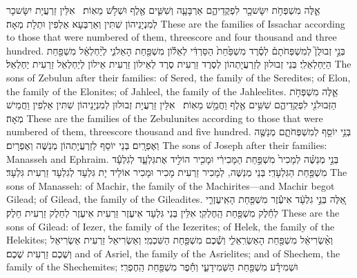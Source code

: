 {אֵ֛לֶּה מִשְׁפְּחֹ֥ת יִשָּׂשכָ֖ר לִפְקֻדֵיהֶ֑ם אַרְבָּעָ֧ה וְשִׁשִּׁ֛ים אֶ֖לֶף וּשְׁלֹ֥שׁ מֵאֽוֹת׃ \setuma }
{אִלֵּין זַרְעֲיָת יִשָּׂשכָר לְמִנְיָנֵיהוֹן שִׁתִּין וְאַרְבְּעָא אַלְפִין וּתְלָת מְאָה׃}
{These are the families of Issachar according to those that were numbered of them, threescore and four thousand and three hundred.}{}
{בְּנֵ֣י זְבוּלֻן֮ לְמִשְׁפְּחֹתָם֒ לְסֶ֗רֶד מִשְׁפַּ֙חַת֙ הַסַּרְדִּ֔י לְאֵל֕וֹן מִשְׁפַּ֖חַת הָאֵלֹנִ֑י לְיַ֨חְלְאֵ֔ל מִשְׁפַּ֖חַת הַיַּחְלְאֵלִֽי׃}
{בְּנֵי זְבוּלוּן לְזַרְעֲיָתְהוֹן לְסֶרֶד זַרְעִית סֶרֶד לְאֵילוֹן זַרְעִית אֵילוֹן לְיַחְלְאֵל זַרְעִית יַחְלְאֵל׃}
{The sons of Zebulun after their families: of Sered, the family of the Seredites; of Elon, the family of the Elonites; of Jahleel, the family of the Jahleelites.}{}
{אֵ֛לֶּה מִשְׁפְּחֹ֥ת הַזְּבוּלֹנִ֖י לִפְקֻדֵיהֶ֑ם שִׁשִּׁ֥ים אֶ֖לֶף וַחֲמֵ֥שׁ מֵאֽוֹת׃ \setuma }
{אִלֵּין זַרְעֲיָת זְבוּלוּן לְמִנְיָנֵיהוֹן שִׁתִּין אַלְפִין וַחֲמֵישׁ מְאָה׃}
{These are the families of the Zebulunites according to those that were numbered of them, threescore thousand and five hundred.}{}
{בְּנֵ֥י יוֹסֵ֖ף לְמִשְׁפְּחֹתָ֑ם מְנַשֶּׁ֖ה וְאֶפְרָֽיִם׃}
{בְּנֵי יוֹסֵף לְזַרְעֲיָתְהוֹן מְנַשֶּׁה וְאֶפְרָיִם׃}
{The sons of Joseph after their families: Manasseh and Ephraim.}{}
{בְּנֵ֣י מְנַשֶּׁ֗ה לְמָכִיר֙ מִשְׁפַּ֣חַת הַמָּכִירִ֔י וּמָכִ֖יר הוֹלִ֣יד אֶת\maqqaf גִּלְעָ֑ד לְגִלְעָ֕ד מִשְׁפַּ֖חַת הַגִּלְעָדִֽי׃}
{ בְּנֵי מְנַשֶּׁה, לְמָכִיר זַרְעִית מָכִיר וּמָכִיר אוֹלֵיד יָת גִּלְעָד לְגִלְעָד זַרְעִית גִּלְעָד׃}
{The sons of Manasseh: of Machir, the family of the Machirites—and Machir begot Gilead; of Gilead, the family of the Gileadites.}{}
{אֵ֚לֶּה בְּנֵ֣י גִלְעָ֔ד אִיעֶ֕זֶר מִשְׁפַּ֖חַת הָאִֽיעֶזְרִ֑י לְחֵ֕לֶק מִשְׁפַּ֖חַת הַֽחֶלְקִֽי׃}
{אִלֵּין בְּנֵי גִּלְעָד אִיעֶזֶר זַרְעִית אִיעֶזֶר לְחֵלֶק זַרְעִית חֵלֶק׃}
{These are the sons of Gilead: of Iezer, the family of the Iezerites; of Helek, the family of the Helekites;}{}
{וְאַ֨שְׂרִיאֵ֔ל מִשְׁפַּ֖חַת הָאַשְׂרִֽאֵלִ֑י וְשֶׁ֕כֶם מִשְׁפַּ֖חַת הַשִּׁכְמִֽי׃}
{וְאַשְׂרִיאֵל זַרְעִית אַשְׂרִיאֵל וְשֶׁכֶם זַרְעִית שֶׁכֶם׃}
{and of Asriel, the family of the Asrielites; and of Shechem, the family of the Shechemites;}{}
{וּשְׁמִידָ֕ע מִשְׁפַּ֖חַת הַשְּׁמִידָעִ֑י וְחֵ֕פֶר מִשְׁפַּ֖חַת הַֽחֶפְרִֽי׃}
